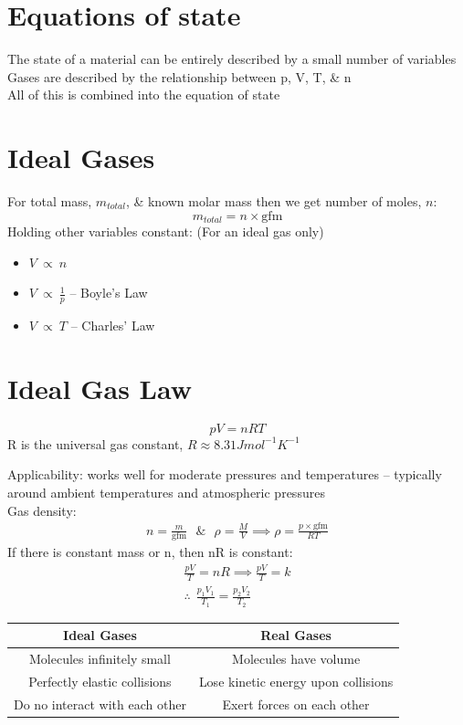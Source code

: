 \documentclass[a4paper, 11pt, fleqn, normalem]{report}
\begin{document}
\section{Equations of state}
The state of a material can be entirely described by a small number of variables \\
Gases are described by the relationship between p, V, T, \& n \\
All of this is combined into the equation of state

\section{Ideal Gases}
For total mass, $m_{total}$, \& known molar mass then we get number of moles, $n$:
\begin{equation*}
	m_{total} = n \times \text{gfm}
\end{equation*}
Holding other variables constant: (For an ideal gas only)
\begin{itemize}
	\item $V~\propto~n$
	\item $V~\propto~\frac{1}{p}$ -- Boyle's Law
	\item $V~\propto~T$ -- Charles' Law
\end{itemize}

\section{Ideal Gas Law}
\vspace{-24pt}
\begin{equation*}
	pV = nRT
\end{equation*}
R is the universal gas constant, $R \approx 8.31 J mol^{-1} K^{-1}$

Applicability: works well for moderate pressures and temperatures -- typically around ambient temperatures and atmospheric pressures \\
Gas density:
\begin{align*}
	n = \frac{m}{\text{gfm}} ~~~\&~~~ \rho = \frac{M}{V} \implies \rho = \frac{p\times\text{gfm}}{RT}
\end{align*}
If there is constant mass or n, then nR is constant:
\begin{gather*}
	\frac{pV}{T} = nR \implies \frac{pV}{T} = k \\
	\therefore ~~\frac{p_{1}V_{1}}{T_{1}} = \frac{p_{2}V_{2}}{T_{2}}
\end{gather*}

\begin{tabular}{c|c}
	Ideal Gases & Real Gases \\
	\hline
	Molecules infinitely small & Molecules have volume \\
	Perfectly elastic collisions & Lose kinetic energy upon collisions \\
	Do no interact with each other & Exert forces on each other
\end{tabular}
\end{document}
